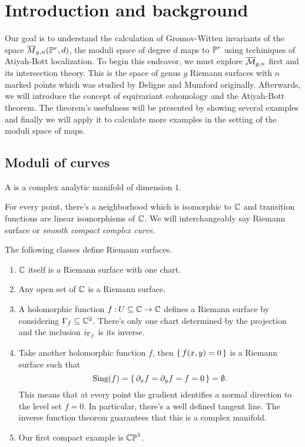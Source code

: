 \documentclass[12pt]{memoir}
\author{\nauthor}
\begin{document}
\chapter{Introduction and background}

Our goal is to understand the calculation of Gromov-Witten invariants of the space $\overline M_{g,n}(\mathbb{P}^r,d)$, the moduli space of degree $d$ maps to $\mathbb{P}^r$ using techiniques of Atiyah-Bott localization. To begin this endeavor, we must explore $\overline{\mathcal{M}}_{g,n}$ first and its intersection theory. This is the space of genus $g$ Riemann surfaces with $n$ marked points which was studied by Deligne and Mumford originally. Afterwards, we will introduce the concept of equivariant cohomology and the Atiyah-Bott theorem. The theorem's usefulness will be presented by showing several examples and finally we will apply it to calculate more examples in the setting of the moduli space of maps.

\section{Moduli of curves}

\begin{Def}
    A  is a complex analytic manifold of dimension $1$. 
\end{Def}
For every point, there's a neighborhood which is isomorphic to $\mathbb{C}$ and transition functions are linear isomorphisms of $\mathbb{C}$. We will interchangeably say Riemann surface or \emph{smooth compact complex curve}.
    
\begin{Ex}
        The following classes define Riemann surfaces.
        \begin{enumerate}
        \item $\mathbb{C}$ itself is a Riemann surface with one chart.
        \item Any open set of $\mathbb{C}$ is a Riemann surface.
        \item A holomorphic function $f\mathbin{:} U\subseteq\mathbb{C}\to\mathbb{C}$ defines a Riemann surface by considering $\Gamma_f\subseteq\mathbb{C}^2$. There's only one chart determined by the projection and the inclusion $i_{\Gamma_f}$ is its inverse.
        \item Take another holomorphic function $f$, then $\{\,f(x,y)=0\,\}$ is a Riemann surface such that 
        $$\text{Sing}(f)=\{\,\partial_xf=\partial_yf=f=0\,\}=\emptyset.$$
        This means that at every point the gradient identifies a normal direction to the level set $f=0$. In particular, there's a well defined tangent line. The inverse function theorem guarantees that this is a complex manifold. 
        \item Our first compact example is $\mathbb{CP}^1$.
        \end{enumerate}
\end{Ex} 
\end{document}
